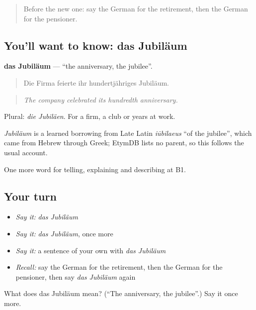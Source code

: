 \begin{quote}
Before the new one: say the German for the retirement, then the German for the pensioner.
\end{quote}

\subsection*{You'll want to know: das Jubiläum}
\textbf{das Jubiläum} — \textquotedblleft{}the anniversary, the jubilee\textquotedblright{}.

\begin{quote}
Die Firma feierte ihr hundertjähriges Jubiläum.
\end{quote}

\begin{quote}
\emph{The company celebrated its hundredth anniversary.}
\end{quote}

Plural: \emph{die Jubiläen}. For a firm, a club or years at work.

\begin{cousinweb}
\emph{Jubiläum} is a learned borrowing from Late Latin \emph{iūbilaeus} \textquotedblleft{}of the jubilee\textquotedblright{}, which came from Hebrew through Greek; EtymDB lists no parent, so this follows the usual account.
\end{cousinweb}

\begin{grammarlens}[title={What you've built}]
One more word for telling, explaining and describing at B1.
\end{grammarlens}

\subsection*{Your turn}
\begin{itemize}
\raggedright
  \item \emph{Say it:} \emph{das Jubiläum}
  \item \emph{Say it:} \emph{das Jubiläum}, once more
  \item \emph{Say it:} a sentence of your own with \emph{das Jubiläum}
  \item \emph{Recall:} say the German for the retirement, then the German for the pensioner, then say \emph{das Jubiläum} again
\end{itemize}

\begin{tcolorbox}[breakable,colback=teal!4,colframe=teal!35!black,title={Before you move on}]
What does das Jubiläum mean? (\textquotedblleft{}The anniversary, the jubilee\textquotedblright{}.) Say it once more.
\end{tcolorbox}
